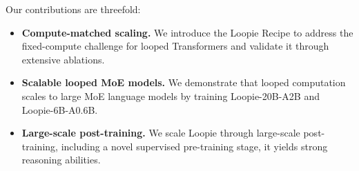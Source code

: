 Our contributions are threefold:
\begin{itemize}
    \item \textbf{Compute-matched scaling.} We introduce the Loopie Recipe to address the fixed-compute challenge for looped Transformers and validate it through extensive ablations.
    \item \textbf{Scalable looped MoE models.} We demonstrate that looped computation scales to large MoE language models by training Loopie-20B-A2B and Loopie-6B-A0.6B.
    \item \textbf{Large-scale post-training.} We scale Loopie through large-scale post-training, including a novel supervised pre-training stage, it yields strong reasoning abilities.
\end{itemize}
